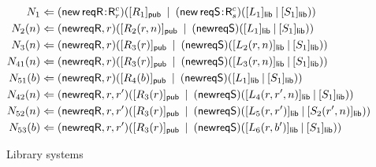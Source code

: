 \documentclass{LMCS}
\newcommand{\pfn}[1]{\mathsf{#1}}  \newcommand{\cfn}[1]{\mathsf{#1}}  \newcommand{\ownfnt}[1]{{\mathsf{#1}}}
\newcommand{\typeletter}[1]{{\mathsf{#1}}}
\newcommand{\tR}{\typeletter{R}}
\newcommand{\Cassoc}[2]{ {{#1}\kern -0.2em : \kern -0.2em {#2}}}
\newcommand{\Cnew}[2]{(\mathop{\pfn{new}} \Cassoc{#1}{#2})}
\newcommand{\CnewNT}[1]{(\pfn{new} {#1})}
\newcommand{\Cpar}{\mathbin{|}}
\newcommand{\Cloc}[2]{[#1]_{\ownfnt{#2}}}
\begin{document}
\begin{figure}[t]
  \begin{align*}
    N_1 &\Leftarrow \Cnew{\reqR}{\tR^c_r}(\Cloc{R_1}{\Cpublic} \;\Cpar\; 
                         \Cnew{\reqS}{\tR^c_s}(\Cloc{L_1}{\Clib}  \Cpar \Cloc{S_1}{\Clib}) ) \\
N_2(n) &\Leftarrow  \CnewNT{\reqR,r}(\Cloc{R_2(r,n)}{\Cpublic} \;\Cpar\; 
                         \CnewNT{\reqS}(\Cloc{L_1}{\Clib}  \Cpar \Cloc{S_1}{\Clib}) ) \\
N_3(n) &\Leftarrow  \CnewNT{\reqR,r}(\Cloc{R_3(r)}{\Cpublic} \;\Cpar\; 
                         \CnewNT{\reqS}(\Cloc{L_2(r,n)}{\Clib}  \Cpar \Cloc{S_1}{\Clib}) ) \\
N_{41}(n) &\Leftarrow  \CnewNT{\reqR,r}(\Cloc{R_3(r)}{\Cpublic} \;\Cpar\; 
                         \CnewNT{\reqS}(\Cloc{L_3(r,n)}{\Clib}  \Cpar \Cloc{S_1}{\Clib}) ) \\
N_{51}(b) &\Leftarrow  \CnewNT{\reqR,r}(\Cloc{R_4(b)}{\Cpublic} \;\Cpar\; 
                         \CnewNT{\reqS}(\Cloc{L_1}{\Clib}  \Cpar \Cloc{S_1}{\Clib}) ) \\
N_{42}(n) &\Leftarrow  \CnewNT{\reqR,r,r'}(\Cloc{R_3(r)}{\Cpublic} \;\Cpar\; 
                         \CnewNT{\reqS}(\Cloc{L_4(r,r',n)}{\Clib}  \Cpar \Cloc{S_1}{\Clib}) ) \\
N_{52}(n) &\Leftarrow  \CnewNT{\reqR,r,r'}(\Cloc{R_3(r)}{\Cpublic} \;\Cpar\; 
                         \CnewNT{\reqS}(\Cloc{L_5(r,r')}{\Clib}  \Cpar \Cloc{S_2(r',n)}{\Clib}) ) \\
N_{53}(b) &\Leftarrow  \CnewNT{\reqR,r,r'}(\Cloc{R_3(r)}{\Cpublic} \;\Cpar\; 
                         \CnewNT{\reqS}(\Cloc{L_6(r,b')}{\Clib}  \Cpar \Cloc{S_1}{\Clib}) ) \\
\end{align*}
  \caption{Library systems}
  \label{fig:libconfs}
\end{figure}
\end{document}
